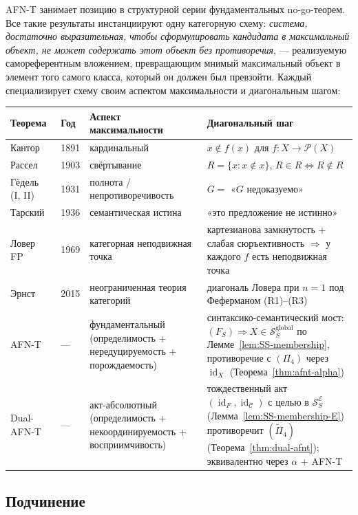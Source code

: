 \documentclass[11pt]{article}
\theoremstyle{plain}
\theoremstyle{definition}
\newcommand{\cS}{\mathcal{S}}
\newcommand{\cC}{\mathcal{C}}
\newcommand{\cP}{\mathcal{P}}
\newcommand{\cE}{\mathcal{E}}
\newcommand{\SSE}{\cS_{S}^{\cE}}
\DeclareMathOperator{\id}{id}
\begin{document}
AFN-T занимает позицию в структурной серии фундаментальных no-go-теорем. Все такие результаты инстанциируют одну категорную схему: \emph{система, достаточно выразительная, чтобы сформулировать кандидата в максимальный объект, не может содержать этот объект без противоречия}, — реализуемую самореферентным вложением, превращающим мнимый максимальный объект в элемент того самого класса, который он должен был превзойти. Каждый специализирует схему своим аспектом максимальности и диагональным шагом:

\begin{center}
\begin{tabular}{@{}l l p{3.2cm} p{5.7cm}@{}}
\toprule
Теорема & Год & Аспект максимальности & Диагональный шаг \\ \midrule
Кантор~\cite{Cantor1891} & 1891 & кардинальный & $x \notin f(x)$ для $f : X \to \cP(X)$ \\
Рассел~\cite{Russell1903} & 1903 & свёртывание & $R = \{x : x \notin x\}$, $R \in R \iff R \notin R$ \\
Гёдель (I, II)~\cite{Godel1931} & 1931 & полнота / непротиворечивость & $G = $ «$G$ недоказуемо» \\
Тарский~\cite{Tarski1936} & 1936 & семантическая истина & «это предложение не истинно» \\
Ловер FP~\cite{Lawvere1969} & 1969 & категорная неподвижная точка & картезианова замкнутость + слабая сюръективность $\Rightarrow$ у каждого $f$ есть неподвижная точка \\
Эрнст~\cite{Ernst2015} & 2015 & неограниченная теория категорий & диагональ Ловера при $n = 1$ под Феферманом (R1)--(R3) \\
AFN-T & --- & фундаментальный (определимость + нередуцируемость + порождаемость) & синтаксико-семантический мост: $(F_S) \Rightarrow X \in \cS_S^{\mathrm{global}}$ по Лемме~\ref{lem:SS-membership}, противоречие с $(\Pi_4)$ через $\id_X$ (Теорема~\ref{thm:afnt-alpha}) \\
Dual-AFN-T & --- & акт-абсолютный (определимость + некоординируемость + восприимчивость) & тождественный акт $(\id_F, \id_\cC)$ с целью в $\SSE$ (Лемма~\ref{lem:SS-membership-E}) противоречит $(\tilde{\Pi}_4)$ (Теорема~\ref{thm:dual-afnt}); эквивалентно через $\alpha$ + AFN-T \\
\bottomrule
\end{tabular}
\end{center}

\subsection{Подчинение}
\end{document}
